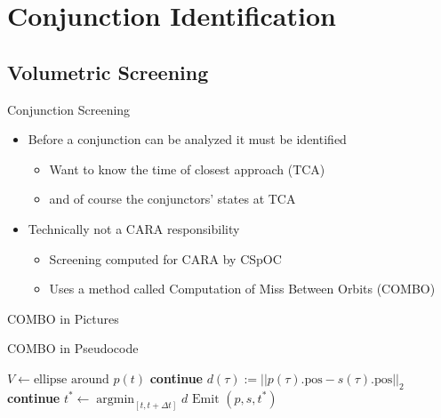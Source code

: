 \documentclass[pdf]{beamer}
\begin{document}
\section{Conjunction Identification}
\subsection{Volumetric Screening}

\begin{frame}{Conjunction Screening}
  \begin{itemize}
  \item Before a conjunction can be analyzed it must be identified
    \begin{itemize}
    \item Want to know the time of closest approach (TCA)
    \item and of course the conjunctors' states at TCA
    \end{itemize}
  \item Technically not a CARA responsibility
    \begin{itemize}
    \item Screening computed for CARA by CSpOC
    \item Uses a method called Computation of Miss Between Orbits (COMBO)
    \end{itemize}
  \end{itemize}
\end{frame}

\begin{frame}{COMBO in Pictures}
\end{frame}

\begin{frame}{COMBO in Pseudocode}
  \begin{algorithmic}
      \State $V \gets \text{ellipse around }p(t)$
        \State \textbf{continue}
      \EndIf
      \State $d(\tau) := || p(\tau).\text{pos}  - s(\tau).\text{pos} ||_2$
        \State \textbf{continue}
      \EndIf
      \State $t^* \gets \operatorname*{argmin}_{[t, t + \Delta t]} d$
      \State $\text{Emit } (p, s, t^*)$
    \EndFor
    \EndProcedure  
  \end{algorithmic}
\end{frame}
\end{document}
